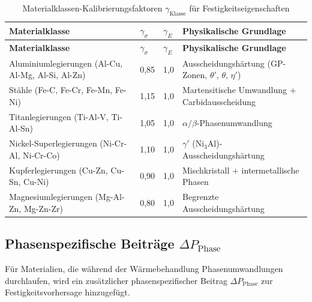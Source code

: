 \documentclass[12pt,a4paper]{article}
\begin{document}
\begin{longtable}{p{3.5cm}p{2.5cm}p{2.5cm}p{5cm}}
	\caption{Materialklassen-Kalibrierungsfaktoren \(\gamma_{\text{Klasse}}\) für Festigkeitseigenschaften} \label{tab:material-class-factors} \\
	\toprule
	\textbf{Materialklasse} & \(\gamma_{\sigma}\) & \(\gamma_{E}\) & \textbf{Physikalische Grundlage} \\
	\midrule
	\endfirsthead
	\toprule
	\textbf{Materialklasse} & \(\gamma_{\sigma}\) & \(\gamma_{E}\) & \textbf{Physikalische Grundlage} \\
	\midrule
	\endhead
	Aluminiumlegierungen (Al-Cu, Al-Mg, Al-Si, Al-Zn) & 0,85 & 1,0 & Ausscheidungshärtung (GP-Zonen, \(\theta'\), \(\theta\), \(\eta'\)) \\
	Stähle (Fe-C, Fe-Cr, Fe-Mn, Fe-Ni) & 1,15 & 1,0 & Martensitische Umwandlung + Carbidausscheidung \\
	Titanlegierungen (Ti-Al-V, Ti-Al-Sn) & 1,05 & 1,0 & \(\alpha/\beta\)-Phasenumwandlung \\
	Nickel-Superlegierungen (Ni-Cr-Al, Ni-Cr-Co) & 1,10 & 1,0 & \(\gamma'\) (Ni\(_3\)Al)-Ausscheidungshärtung \\
	Kupferlegierungen (Cu-Zn, Cu-Sn, Cu-Ni) & 0,90 & 1,0 & Mischkristall + intermetallische Phasen \\
	Magnesiumlegierungen (Mg-Al-Zn, Mg-Zn-Zr) & 0,80 & 1,0 & Begrenzte Ausscheidungshärtung \\
	\bottomrule
\end{longtable}

\subsection{Phasenspezifische Beiträge \(\Delta P_{\text{Phase}}\)}
\label{subsec:phase-contributions}

Für Materialien, die während der Wärmebehandlung Phasenumwandlungen durchlaufen, wird ein zusätzlicher phasenspezifischer Beitrag \(\Delta P_{\text{Phase}}\) zur Festigkeitsvorhersage hinzugefügt.
\end{document}

